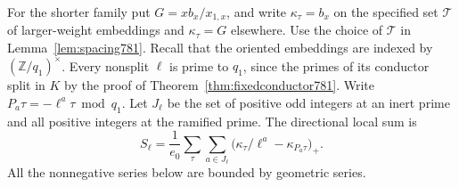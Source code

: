 \documentclass[a4paper,11pt]{article}
\theoremstyle{definition}
\theoremstyle{remark}
\numberwithin{equation}{section}
\begin{document}
For the shorter family put \(G=xb_x/x_{1,x}\), and write
\(\kappa_\tau=b_x\) on the specified set \(\mathcal T\) of
larger-weight embeddings and \(\kappa_\tau=G\) elsewhere.
Use the choice of \(\mathcal T\) in Lemma~\ref{lem:spacing781}.
Recall that the oriented embeddings are indexed by
\((\mathbb Z/q_1)^\times\). Every nonsplit \(\ell\) is
prime to \(q_1\), since the primes of its conductor split
in \(K\) by the proof of Theorem~\ref{thm:fixedconductor781}.
Write \(P_a\tau=-\ell^a\tau\bmod q_1\).
Let \(J_\ell\) be the set of positive odd integers at an
inert prime and all positive integers at the ramified prime.
The directional local sum is
\[
     S_\ell=\frac1{e_0}\sum_\tau\sum_{a\in J_\ell}
                  \bigl(\kappa_\tau/\ell^a-\kappa_{P_a\tau}\bigr)_+ .
\]
All the nonnegative series below are bounded by geometric series.
\end{document}
